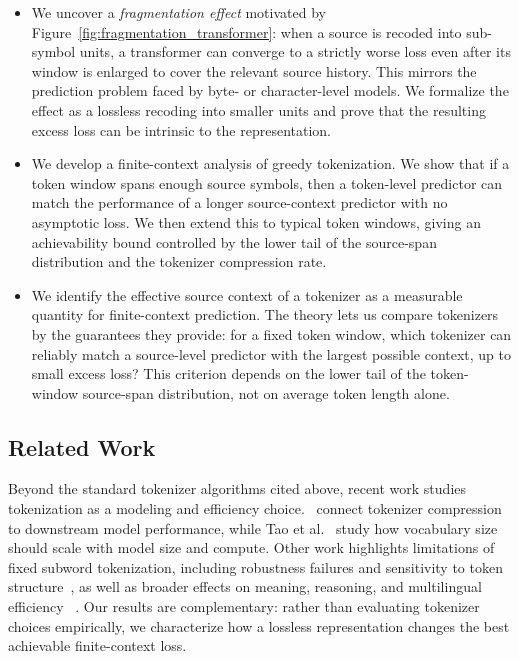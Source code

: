 \documentclass{article}
\theoremstyle{plain}
\theoremstyle{definition}
\theoremstyle{remark}
\begin{document}
    \begin{itemize}
        \item We uncover a \emph{fragmentation effect} motivated by
    Figure~\ref{fig:fragmentation_transformer}: when a source is recoded into
    sub-symbol units, a transformer can converge to a strictly worse
    loss even after its window is enlarged to cover the relevant source history.
    This mirrors the prediction problem faced by byte- or character-level models.
    We formalize the effect as a lossless recoding into smaller units and prove that
    the resulting excess loss can be intrinsic to the representation.
    
    \item We develop a finite-context analysis of greedy tokenization. We show
        that if a token window spans enough source symbols, then a token-level
        predictor can match the performance of a longer source-context predictor
        with no asymptotic loss. We then extend this to typical token windows,
        giving an achievability bound controlled by the lower tail of the
        source-span distribution and the tokenizer compression rate.
    
    \item We identify the effective source context of a tokenizer as a
    measurable quantity for finite-context prediction. The theory lets us compare
    tokenizers by the guarantees they provide: for a fixed token window, which
    tokenizer can reliably match a source-level predictor with the largest possible
    context, up to small excess loss? This criterion depends on the lower tail of
    the token-window source-span distribution, not on average token length alone.
    \end{itemize}
    
    
    \subsection{Related Work}
    
    Beyond the standard tokenizer algorithms cited above, recent work studies
    tokenization as a modeling and efficiency choice.~\cite{goldmanUnpackingTokenizationEvaluating2024} connect tokenizer
    compression to downstream model performance, while Tao et
    al.~\citep{taoScalingLawsVocabulary} study how vocabulary size should scale
    with model size and compute. Other work highlights limitations of fixed subword
    tokenization, including robustness failures and sensitivity to token
    structure~\citep{chaiTokenizationFallingShort2024}, as well as broader effects
    on meaning, reasoning, and multilingual efficiency
    ~\citep{haslettTokenizationChangesMeaning2025,
    zhangTokenizationConstraintsLLMs2025}. Our results are complementary:
    rather than evaluating tokenizer choices empirically, we characterize how a
    lossless representation changes the best achievable finite-context loss.
    
\end{document}
